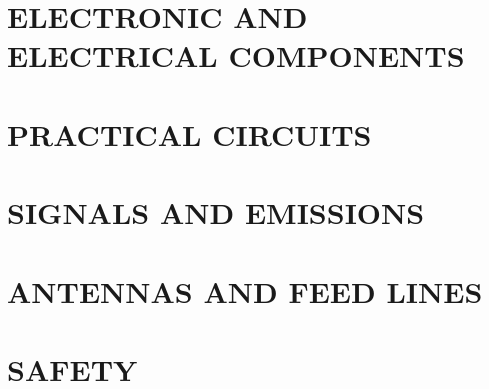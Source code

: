 \documentclass[12pt]{book}
\begin{document}
\chapter{ELECTRONIC AND ELECTRICAL COMPONENTS}
\label{chapter:electronic_and_electrical_components}




\chapter{PRACTICAL CIRCUITS}
\label{chapter:practical_circuits}




\chapter{SIGNALS AND EMISSIONS}
\label{chapter:signals_and_emissions}




\chapter{ANTENNAS AND FEED LINES}
\label{chapter:antennas_and_feed_lines}




\chapter{SAFETY}
\label{chapter:safety}



\end{document}
